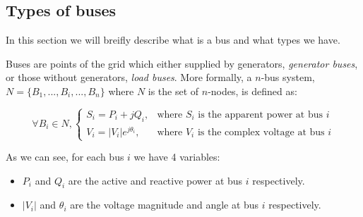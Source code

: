 \documentclass[a4paper,11pt, titlepage, twoside]{article}
\begin{document}
\subsection{Types of buses}

In this section we will breifly describe what is a bus and what types we have.\par
Buses are points of the grid which either supplied by generators, \textit{generator buses}, or those without generators, \textit{load buses}. More formally, a $n$-bus system, $N=\{B_1,...,B_i,...,B_n\}$ where $N$ is the set of $n$-nodes, is defined as:

\begin{equation}
    \forall B_i \in N,
    \begin{cases}
        S_i = P_i + jQ_i, & \text{where } S_i \text{ is the apparent power at bus } i \\
        V_i = |V_i|e^{j\theta_i}, & \text{where } V_i \text{ is the complex voltage at bus } i
    \end{cases}
\end{equation}

As we can see, for each bus $i$ we have 4 variables:

\begin{itemize}
    \item $P_i$ and $Q_i$ are the active and reactive power at bus $i$ respectively.
    \item $|V_i|$ and $\theta_i$ are the voltage magnitude and angle at bus $i$ respectively.
\end{itemize}
\end{document}
